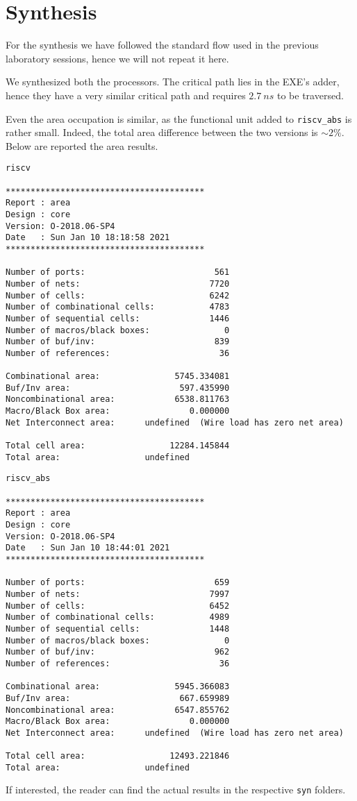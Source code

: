 \chapter{Synthesis}

For the synthesis we have followed the standard flow used in the previous laboratory sessions, hence we will
not repeat it here.

We synthesized both the processors. The critical path lies in the EXE's adder, hence they have a very similar critical
path and requires $2.7\ ns$ to be traversed.

Even the area occupation is similar, as the functional unit added to \verb|riscv_abs| is rather small. Indeed, the total
area difference between the two versions is $\sim 2\%$.
Below are reported the area results.

\begin{Verbatim}
riscv

****************************************
Report : area
Design : core
Version: O-2018.06-SP4
Date   : Sun Jan 10 18:18:58 2021
****************************************

Number of ports:                          561
Number of nets:                          7720
Number of cells:                         6242
Number of combinational cells:           4783
Number of sequential cells:              1446
Number of macros/black boxes:               0
Number of buf/inv:                        839
Number of references:                      36

Combinational area:               5745.334081
Buf/Inv area:                      597.435990
Noncombinational area:            6538.811763
Macro/Black Box area:                0.000000
Net Interconnect area:      undefined  (Wire load has zero net area)

Total cell area:                 12284.145844
Total area:                 undefined
\end{Verbatim}

\bigskip

\begin{Verbatim}
riscv_abs
    
****************************************
Report : area
Design : core
Version: O-2018.06-SP4
Date   : Sun Jan 10 18:44:01 2021
****************************************

Number of ports:                          659
Number of nets:                          7997
Number of cells:                         6452
Number of combinational cells:           4989
Number of sequential cells:              1448
Number of macros/black boxes:               0
Number of buf/inv:                        962
Number of references:                      36

Combinational area:               5945.366083
Buf/Inv area:                      667.659989
Noncombinational area:            6547.855762
Macro/Black Box area:                0.000000
Net Interconnect area:      undefined  (Wire load has zero net area)

Total cell area:                 12493.221846
Total area:                 undefined
\end{Verbatim}

If interested, the reader can find the actual results in the respective \verb|syn| folders.
